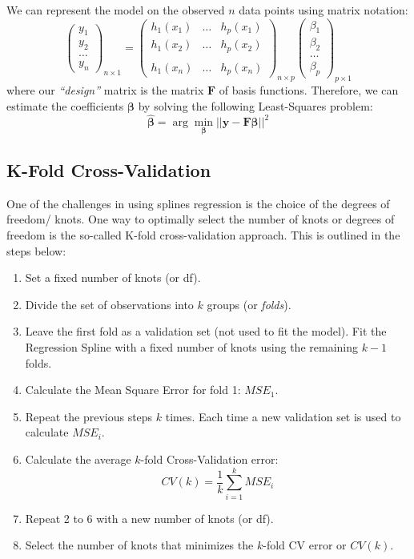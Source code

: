 \documentclass[
]{book}
\providecommand{\tightlist}{%
  \setlength{\itemsep}{0pt}\setlength{\parskip}{0pt}}
\begin{document}
We can represent the model on the observed \(n\) data points using matrix notation:
\[
      \begin{pmatrix}
        y_1\\
        y_2\\
        \ldots\\
        y_n
      \end{pmatrix}_{n\times 1} =
      \begin{pmatrix}
         h_1(x_1)& \ldots & h_{p}(x_1)\\
          h_1(x_2)& \ldots & h_{p}(x_2)\\
         \\
           h_1(x_n)& \ldots & h_{p}(x_n)
      \end{pmatrix}_{n\times p}
      \begin{pmatrix}
      \beta_1\\
      \beta_2\\
      \ldots\\
      \beta_p
      \end{pmatrix}_{p\times 1}
\]
where our \emph{``design''} matrix is the matrix \(\mathbf{F}\) of basis functions. Therefore, we can estimate the coefficients \(\mathbf{\beta}\) by solving the following Least-Squares problem:
\[\hat{\mathbf{\beta}}= \arg\min_{\mathbf{\beta}}||\mathbf{y} - \mathbf{F}{\mathbf{\beta}|}|^2\]

\subsection{K-Fold Cross-Validation}\label{k-fold-cross-validation}

One of the challenges in using splines regression is the choice of the degrees of freedom/ knots. One way to optimally select the number of knots or degrees of freedom is the so-called K-fold cross-validation approach. This is outlined in the steps below:

\begin{enumerate}
\def\labelenumi{\arabic{enumi}.}
\tightlist
\item
  Set a fixed number of knots (or df).
\item
  Divide the set of observations into \(k\) groups (or \emph{folds}).
\item
  Leave the first fold as a validation set (not used to fit the model). Fit the Regression Spline with a fixed number of knots using the remaining \(k-1\) folds.
\item
  Calculate the Mean Square Error for fold 1: \(MSE_1\).
\item
  Repeat the previous steps \(k\) times. Each time a new validation set is used to calculate \(MSE_i\).
\item
  Calculate the average \(k\)-fold Cross-Validation error: \[CV(k)=\frac{1}{k}\sum_{i=1}^k MSE_i\]
\item
  Repeat 2 to 6 with a new number of knots (or df).
\item
  Select the number of knots that minimizes the \(k\)-fold CV error or \(CV(k)\).
\end{enumerate}
\end{document}
